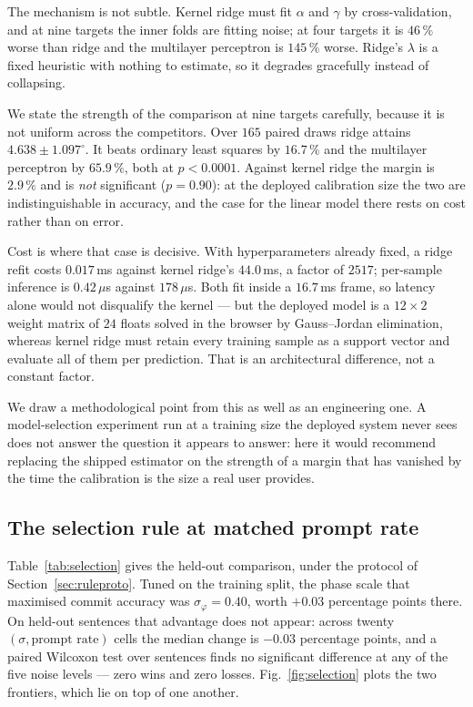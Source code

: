 \documentclass[conference]{IEEEtran}
\begin{document}
The mechanism is not subtle. Kernel ridge must fit $\alpha$ and $\gamma$ by
cross-validation, and at nine targets the inner folds are fitting noise; at four
targets it is $46\,\%$ worse than ridge and the multilayer perceptron is
$145\,\%$ worse. Ridge's $\lambda$ is a fixed heuristic with nothing to
estimate, so it degrades gracefully instead of collapsing.

We state the strength of the comparison at nine targets carefully, because it
is not uniform across the competitors. Over $165$ paired draws ridge attains
$4.638 \pm 1.097^\circ$. It beats ordinary least squares by $16.7\,\%$ and the
multilayer perceptron by $65.9\,\%$, both at $p < 0.0001$. Against kernel ridge
the margin is $2.9\,\%$ and is \emph{not} significant ($p = 0.90$): at the
deployed calibration size the two are indistinguishable in accuracy, and the
case for the linear model there rests on cost rather than on error.

Cost is where that case is decisive. With hyperparameters already fixed, a ridge
refit costs $0.017$\,ms against kernel ridge's $44.0$\,ms, a factor of $2517$;
per-sample inference is $0.42\,\mu$s against $178\,\mu$s. Both fit inside a
$16.7$\,ms frame, so latency alone would not disqualify the kernel --- but the
deployed model is a $12 \times 2$ weight matrix of $24$ floats solved in the
browser by Gauss--Jordan elimination, whereas kernel ridge must retain every
training sample as a support vector and evaluate all of them per prediction.
That is an architectural difference, not a constant factor.

We draw a methodological point from this as well as an engineering one. A
model-selection experiment run at a training size the deployed system never sees
does not answer the question it appears to answer: here it would recommend
replacing the shipped estimator on the strength of a margin that has vanished by
the time the calibration is the size a real user provides.

\subsection{The selection rule at matched prompt rate}
\label{sec:ruleresult}

Table~\ref{tab:selection} gives the held-out comparison, under the protocol of
Section~\ref{sec:ruleproto}. Tuned on the training
split, the phase scale that maximised commit accuracy was
$\sigma_\varphi = 0.40$, worth $+0.03$ percentage points there. On held-out
sentences that advantage does not appear: across twenty $(\sigma, \text{prompt
rate})$ cells the median change is $-0.03$ percentage points, and a paired
Wilcoxon test over sentences finds no significant difference at any of the five
noise levels --- zero wins and zero losses. Fig.~\ref{fig:selection} plots the
two frontiers, which lie on top of one another.
\end{document}
